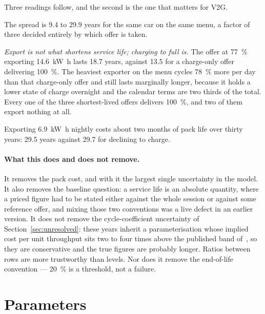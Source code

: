 \documentclass[11pt,a4paper]{article}
\begin{document}
Three readings follow, and the second is the one that matters for V2G.

The spread is \num{9.4} to \num{29.9} years for the same car on the
same menu, a factor of three decided entirely by which offer is taken.

\emph{Export is not what shortens service life; charging to full is.}
The offer at \SI{77}{\percent} exporting \SI{14.6}{\kilo\watt\hour}
lasts \num{18.7} years, against \num{13.5} for a charge-only offer
delivering \SI{100}{\percent}. The heaviest exporter on the menu
cycles \SI{78}{\percent} more per day than that charge-only offer and
still lasts marginally longer, because it holds a lower state of
charge overnight and the calendar terms are two thirds of the total.
Every one of the three shortest-lived offers delivers
\SI{100}{\percent}, and two of them export nothing at all.

Exporting \SI{6.9}{\kilo\watt\hour} nightly costs about two months of
pack life over thirty years: \num{29.5} years against \num{29.7} for
declining to charge.

\paragraph{What this does and does not remove.}
It removes the pack cost, and with it the largest single uncertainty
in the model. It also removes the baseline question: a service life is
an absolute quantity, where a priced figure had to be stated either
against the whole session or against some reference offer, and mixing
those two conventions was a live defect in an earlier version. It does
not remove the
cycle-coefficient uncertainty of
Section~\ref{sec:unresolved}: these years inherit a parameterisation
whose implied cost per unit throughput sits two to four times above
the published band of~\cite{preis2023}, so they are conservative and
the true figures are probably longer. Ratios between rows are more
trustworthy than levels. Nor does it remove the end-of-life
convention --- \SI{20}{\percent} is a threshold, not a failure.

\section{Parameters}
\label{sec:parameters}
\end{document}
